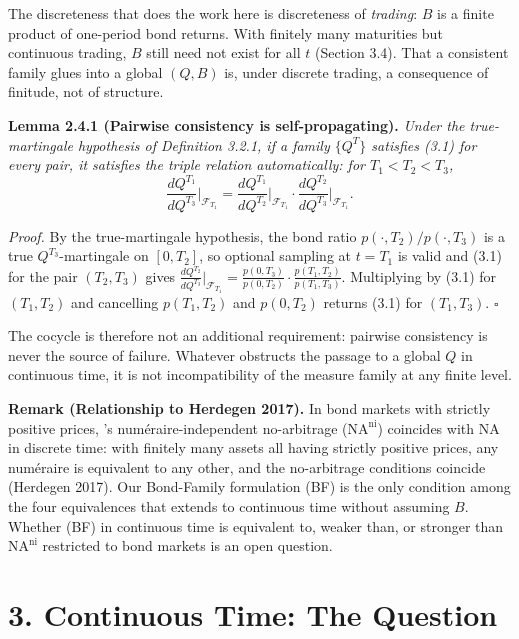 \documentclass[
]{article}
\begin{document}
The discreteness that does the work here is discreteness of
\emph{trading}: \(B\) is a finite product of one-period bond returns.
With finitely many maturities but continuous trading, \(B\) still need
not exist for all \(t\) (Section 3.4). That a consistent family glues
into a global \((Q, B)\) is, under discrete trading, a consequence of
finitude, not of structure.

\textbf{Lemma 2.4.1 (Pairwise consistency is self-propagating).}
\emph{Under the true-martingale hypothesis of Definition 3.2.1, if a
family \(\{Q^T\}\) satisfies (3.1) for every pair, it satisfies the
triple relation automatically: for \(T_1 < T_2 < T_3\),}
\[\frac{dQ^{T_1}}{dQ^{T_3}}\bigg|_{\mathcal{F}_{T_1}} = \frac{dQ^{T_1}}{dQ^{T_2}}\bigg|_{\mathcal{F}_{T_1}} \cdot \frac{dQ^{T_2}}{dQ^{T_3}}\bigg|_{\mathcal{F}_{T_1}}.\]

\emph{Proof.} By the true-martingale hypothesis, the bond ratio
\(p(\cdot,T_2)/p(\cdot,T_3)\) is a true \(Q^{T_3}\)-martingale on
\([0,T_2]\), so optional sampling at \(t = T_1\) is valid and (3.1) for
the pair \((T_2, T_3)\) gives
\(\frac{dQ^{T_2}}{dQ^{T_3}}\big|_{\mathcal{F}_{T_1}}
= \frac{p(0,T_3)}{p(0,T_2)} \cdot \frac{p(T_1,T_2)}{p(T_1,T_3)}\).
Multiplying by (3.1) for \((T_1, T_2)\) and cancelling \(p(T_1,T_2)\)
and \(p(0,T_2)\) returns (3.1) for \((T_1, T_3)\). \(\square\)

The cocycle is therefore not an additional requirement: pairwise
consistency is never the source of failure. Whatever obstructs the
passage to a global \(Q\) in continuous time, it is not incompatibility
of the measure family at any finite level.

\textbf{Remark (Relationship to Herdegen 2017).} In bond markets with
strictly positive prices, \citeauthor{Herdegen2017}'s numéraire-independent no-arbitrage
(\(\text{NA}^{\text{ni}}\)) coincides with NA in discrete time: with
finitely many assets all having strictly positive prices, any numéraire
is equivalent to any other, and the no-arbitrage conditions coincide
(Herdegen 2017). Our Bond-Family formulation (BF) is the only condition
among the four equivalences that extends to continuous time without
assuming \(B\). Whether (BF) in continuous time is equivalent to, weaker
than, or stronger than \(\text{NA}^{\text{ni}}\) restricted to bond
markets is an open question.

\section{3. Continuous Time: The
Question}\label{continuous-time-the-question}
\end{document}

